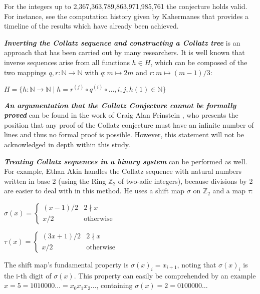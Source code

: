 \par\medskip
For the integers up to 2,367,363,789,863,971,985,761 the conjecture holds valid. For instance, see the computation history given by Kahermanes \cite{Ref_Kahermanes_2011} that provides a timeline of the results which have already been achieved.

\par\medskip
\textit{\textbf{Inverting the Collatz sequence and constructing a Collatz tree}} is an approach that has been carried out by many researchers. It is well known that inverse sequences \cite{Ref_Klisse_2010} arise from all functions $h\in H$, which can be composed of the two mappings $q,r:\mathbb{N}\rightarrow\mathbb{N}$ with $q:m\mapsto2m$ and $r:m\mapsto(m-1)/3$:
\begin{center}
$H=\{h:\mathbb{N}\rightarrow
\mathbb{N}\mid h=r^{(j)}\circ q^{(i)}\circ\ldots,i,j,h(1)\in\mathbb{N}\}$
\end{center}

\textit{\textbf{An argumentation that the Collatz Conjecture cannot be formally proved}} can be found in the work of Craig Alan Feinstein \cite{Ref_Feinstein_2012}, who presents the position that any proof of the Collatz conjecture must have an infinite number of lines and thus no formal proof is possible. However, this statement will not be acknowledged in depth within this study.

\par\medskip
\textit{\textbf{Treating Collatz sequences in a binary system}} can be performed as well. For example, Ethan Akin \cite{Ref_Akin_2004} handles the Collatz sequence with natural numbers written in base 2 (using the Ring $\mathbb{Z}_2$ of two-adic integers), because divisions by 2 are easier to deal with in this method. He uses a shift map $\sigma$ on $\mathbb{Z}_2$ and a map $\tau$:

\begin{table}[H]
	\centering
	\parbox{.45\linewidth}{
		$\sigma(x)=
		\begin{cases}
		(x-1)/2		&	2\nmid x\\
		x/2			&	\text{otherwise}
		\end{cases}$
	}
	\parbox[][][b]{.45\linewidth}{
		$\tau(x)=
		\begin{cases}
		(3x+1)/2	&	2\nmid x\\
		x/2			&	\text{otherwise}
		\end{cases}$
	}
\end{table}

The shift map's fundamental property is $\sigma(x)_i=x_{i+1}$, noting that $\sigma(x)_i$ is the i-th digit of $\sigma(x)$. This property can easily be comprehended by an example $x=5=1010000\ldots=x_0x_1x_2\ldots$, containing $\sigma(x)=2=0100000\ldots$

